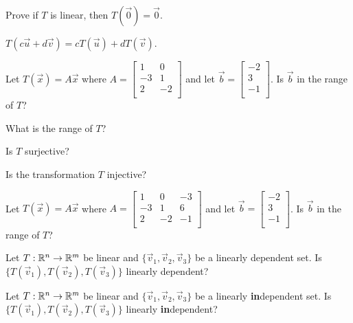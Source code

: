 \begin{enumerate}

\Part Prove if $T$ is linear, then $T(\vec{0})=\vec{0}$.

\vfill 

\Part $T(c\vec{u}+d\vec{v})=cT(\vec{u})+dT(\vec{v})$.

\vfill

\Problem Let $T(\vec{x})=A\vec{x}$ where $A=\begin{bmatrix}
1 & 0\\
-3 & 1\\
2 & -2\\
\end{bmatrix}$ and let $\vec{b}=\begin{bmatrix}
-2\\3\\-1\\
\end{bmatrix}$. 
\Part Is $\vec{b}$ in the range of $T$?

\vfill

\Part What is the range of $T$?

\vfill

\newpage

\Part Is $T$ surjective?

\vfill

\Part Is the transformation $T$ injective?

\vfill

\newpage


\Problem Let $T(\vec{x})=A\vec{x}$ where $A=\begin{bmatrix}
1 & 0 &-3\\
-3 & 1 & 6\\
2 & -2 & -1\\
\end{bmatrix}$ and let $\vec{b}=\begin{bmatrix}
-2\\3\\-1\\
\end{bmatrix}$. Is $\vec{b}$ in the range of $T$?

\vfill

\Problem Let $T:\mathbb{R}^n \to \mathbb{R}^m$ be linear and $\{\vec{v}_1, \vec{v}_2,\vec{v}_3\}$ be a linearly dependent set. Is $\{T(\vec{v}_1), T(\vec{v}_2),T(\vec{v}_3)\}$ linearly dependent?

\vfill


\Problem Let $T:\mathbb{R}^n \to \mathbb{R}^m$ be linear and $\{\vec{v}_1, \vec{v}_2,\vec{v}_3\}$ be a linearly \textbf{in}dependent set.  Is $\{T(\vec{v}_1), T(\vec{v}_2),T(\vec{v}_3)\}$ linearly \textbf{in}dependent?



\vfill


\end{enumerate}

